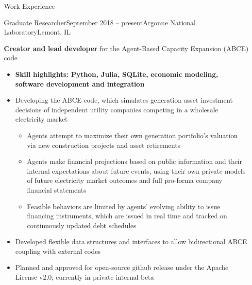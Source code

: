 \documentclass{resume} %
\begin{document}

\begin{rSection}{Work Experience}

\begin{rSubsection}{Graduate Researcher}{September 2018 -- present}{Argonne National Laboratory}{Lemont, IL}
  \item \textbf{Creator and lead developer} for the Agent-Based Capacity Expansion (ABCE) code
    \begin{itemize}
      \setlength{\itemsep}{-3pt}
      \item \textbf{Skill highlights: Python, Julia, SQLite, economic modeling, software development and integration}
      \item Developing the ABCE code, which simulates generation asset investment decisions of independent utility companies competing in a wholesale electricity market
        \begin{itemize}
          \item Agents attempt to maximize their own generation portfolio's valuation via new construction projects and asset retirements
          \item Agents make financial projections based on public information and their internal expectations about future events, using their own private models of future electricity market outcomes and full pro-forma company financial statements
          \item Feasible behaviors are limited by agents' evolving ability to issue financing instruments, which are issued in real time and tracked on continuously updated debt schedules
        \end{itemize}
      \item Developed flexible data structures and interfaces to allow bidirectional ABCE coupling with external codes
      \item Planned and approved for open-source github release under the Apache License v2.0; currently in private internal beta
    \end{itemize}


\end{rSubsection}
\end{rSection}
\end{document}

